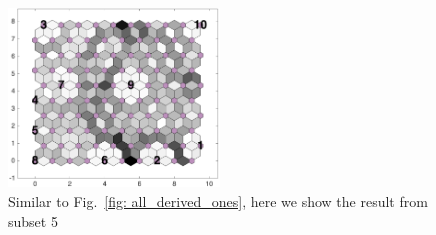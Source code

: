 \begin{figure}
        \centering
        \includegraphics[width=0.5\textwidth]{../../images0.01/M31/2D/image_subsets/subset3_dist_with_hits_t.png}
    \caption{Similar to Fig.~\ref{fig: all_derived_ones}, here we show the result from subset 5}
    \label{fig: subset3}
\end{figure}